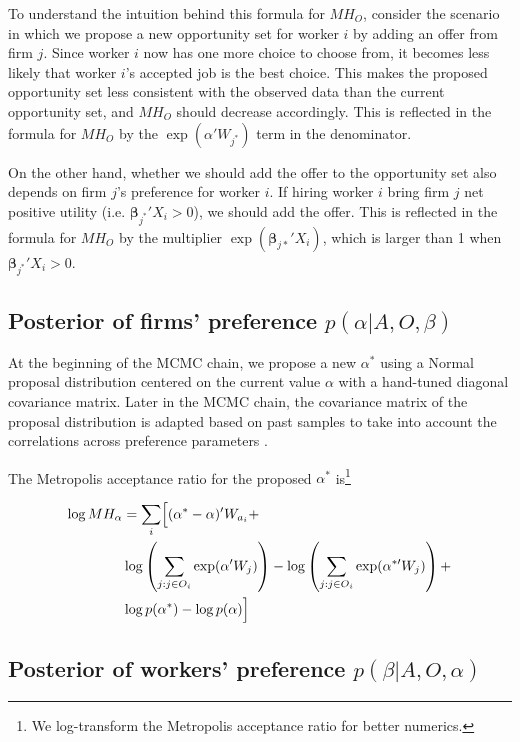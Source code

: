 To understand the intuition behind this formula for $MH_O$, consider the
scenario in which we propose a new opportunity set for worker $i$ by adding an
offer from firm $j$. Since worker $i$ now has one more choice to choose from, it
becomes less likely that worker $i$'s accepted job is the best choice. This
makes the proposed opportunity set less consistent with the observed data than
the current opportunity set, and $MH_O$ should decrease accordingly. This is
reflected in the formula for $MH_O$ by the $\exp(\alpha'W_{j^*})$ term in the
denominator.

On the other hand, whether we should add the offer to the opportunity set also
depends on firm $j$'s preference for worker $i$. If hiring worker $i$ bring firm
$j$ net positive utility (i.e. $\bm{\beta}_{j^*}'X_i > 0$), we should add the
offer. This is reflected in the formula for $MH_O$ by the multiplier
$\exp(\bm{\beta}_{j*}'X_i)$, which is larger than 1 when $\bm{\beta}_{j^*}'X_i >
0$.

\subsection{Posterior of firms' preference $p(\alpha|A, O, \beta)$}

At the beginning of the MCMC chain, we propose a new $\alpha^*$ using a Normal
proposal distribution centered on the current value $\alpha$ with a hand-tuned
diagonal covariance matrix. Later in the MCMC chain, the covariance matrix of
the proposal distribution is adapted based on past samples to take into account
the correlations across preference parameters \citep{Haario2001}.

The Metropolis acceptance ratio for the proposed $\alpha^*$ is\footnote{We
  log-transform the Metropolis acceptance ratio for better numerics.}

\begin{align}
  \log MH_\alpha &= \sum_i \Bigl[ (\alpha^* - \alpha)' W_{a_i} + \nonumber \\
                 & \log\left(\sum\limits_{j:j \in O_i} \exp(\alpha' W_j)\right) -
                   \log\left(\sum\limits_{j:j \in O_i} \exp(\alpha^{*\prime} W_j)\right) + \nonumber\\
                 & \log p(\alpha^*) - \log p(\alpha) \Bigr]
\end{align}

\subsection{Posterior of workers' preference $p(\beta|A, O, \alpha)$}

